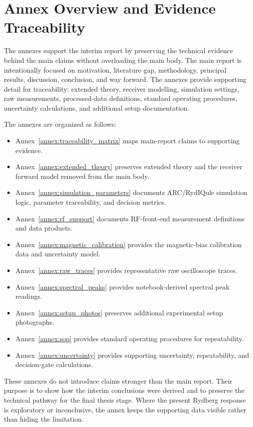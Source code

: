 \documentclass{ieeeaccess}
\begin{document}
\section{Annex Overview and Evidence Traceability}
\label{annex:overview}

The annexes support the interim report by preserving the technical evidence behind the main claims without overloading the main body. The main report is intentionally focused on motivation, literature gap, methodology, principal results, discussion, conclusion, and way forward. The annexes provide supporting detail for traceability: extended theory, receiver modelling, simulation settings, raw measurements, processed-data definitions, standard operating procedures, uncertainty calculations, and additional setup documentation.

The annexes are organized as follows:
\begin{itemize}
    \item Annex~\ref{annex:traceability_matrix} maps main-report claims to supporting evidence.
    \item Annex~\ref{annex:extended_theory} preserves extended theory and the receiver forward model removed from the main body.
    \item Annex~\ref{annex:simulation_parameters} documents ARC/RydIQule simulation logic, parameter traceability, and decision metrics.
    \item Annex~\ref{annex:rf_support} documents RF-front-end measurement definitions and data products.
    \item Annex~\ref{annex:magnetic_calibration} provides the magnetic-bias calibration data and uncertainty model.
    \item Annex~\ref{annex:raw_traces} provides representative raw oscilloscope traces.
    \item Annex~\ref{annex:spectral_peaks} provides notebook-derived spectral peak readings.
    \item Annex~\ref{annex:setup_photos} preserves additional experimental setup photographs.
    \item Annex~\ref{annex:sop} provides standard operating procedures for repeatability.
    \item Annex~\ref{annex:uncertainty} provides supporting uncertainty, repeatability, and decision-gate calculations.
\end{itemize}

These annexes do not introduce claims stronger than the main report. Their purpose is to show how the interim conclusions were derived and to preserve the technical pathway for the final thesis stage. Where the present Rydberg response is exploratory or inconclusive, the annex keeps the supporting data visible rather than hiding the limitation.
\end{document}
